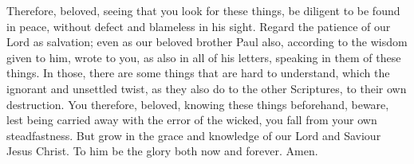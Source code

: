 Therefore, beloved, seeing that you look for these
things, be diligent to be found in peace, without defect and blameless
in his sight.  Regard the patience of our Lord as
salvation; even as our beloved brother Paul also, according to the
wisdom given to him, wrote to you,  as also in all of his
letters, speaking in them of these things. In those, there are some
things that are hard to understand, which the ignorant and unsettled
twist, as they also do to the other Scriptures, to their own
destruction.  You therefore, beloved, knowing these
things beforehand, beware, lest being carried away with the error of the
wicked, you fall from your own steadfastness.  But grow
in the grace and knowledge of our Lord and Saviour Jesus Christ. To him
be the glory both now and forever. Amen.

